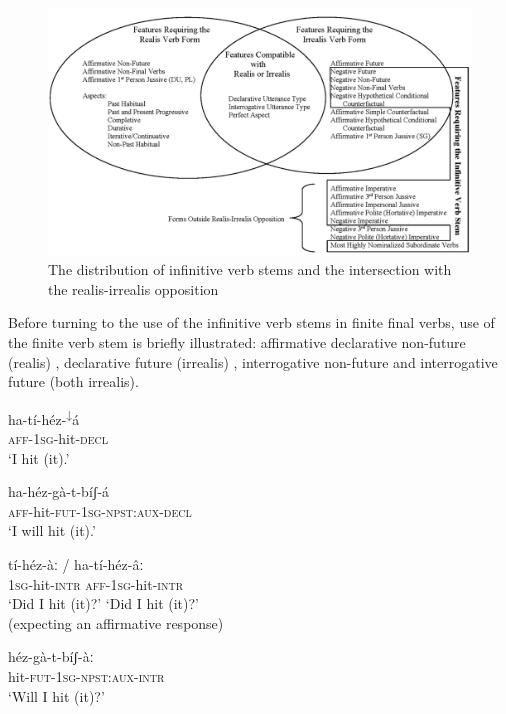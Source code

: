 \documentclass[output=paper]{langsci/langscibook}
\begin{document}
\begin{figure}
\includegraphics[width=\textwidth]{figures/MAhlandFig2.png}
\caption{The distribution of infinitive verb stems and the intersection with the realis-irrealis opposition}
\label{fig:2}
\end{figure}


Before turning to the use of the infinitive verb stems in finite final verbs, use of the finite verb stem is briefly illustrated: affirmative declarative non-future (realis) , declarative future (irrealis) , interrogative non-future  and interrogative future  (both irrealis).

\ea\label{ex:mahland:52}
\gll ha-t\'{i}-h\'{e}z-\textsuperscript{↓}\'{a}\\
\textsc{aff-1sg}{}-hit-\textsc{decl} \\
\glt `I hit (it).'
\z

\ea\label{ex:mahland:53}
\gll ha-h\'{e}z-g\`{a}-t-b\'{i}ʃ-\'{a}\\
\textsc{aff}{}-hit-\textsc{fut-1sg-npst:aux-decl} \\
\glt `I will hit (it).'
\z

\ea\label{ex:mahland:54}
\gll t\'{i}-h\'{e}z-\`{a}ː       /    ha-t\'{i}-h\'{e}z-\^{a}ː\\
\textsc{1sg}{}-hit-\textsc{intr     aff-1sg}{}-hit-\textsc{intr}\\
\glt `Did I hit (it)?'      `Did I hit (it)?' \\
(expecting an affirmative response)
\z

\ea\label{ex:mahland:55}
\gll h\'{e}z-g\`{a}-t-b\'{i}ʃ-\`{a}ː\\
hit-\textsc{fut-1sg-npst:aux-intr}\\
\glt `Will I hit (it)?'
\z
\end{document}
